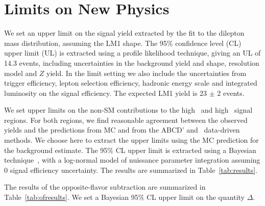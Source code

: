 \section{Limits on New Physics}
\label{sec:limit}

We set an upper limit on the signal yield extracted by the fit to the dilepton mass
distribution, assuming the LM1 shape. The 95\% confidence level (CL) upper limit (UL)
is extracted using a profile likelihood technique, giving an UL of 14.3 events, including
uncertainties in the background yield and shape, resolution model and $Z$ yield.
In the limit setting we also include the uncertainties from trigger efficiency,
lepton selection efficiency, hadronic energy scale and integrated luminosity on the signal efficiency.
The expected LM1 yield is 23 $\pm$ 2 events. 

We set upper limits on the non-SM contributions to the high \MET\ and high \Ht\ signal regions. 
For both regions, we find reasonable agreement between the observed yields and the predictions from MC and from the ABCD' and \ptll\
data-driven methods. We choose here to extract the upper limits using the MC prediction for the
background estimate. The 95\% CL upper limit is extracted using a Bayesian technique~\cite{ref:cl95cms}, 
with a log-normal model of nuissance parameter integration assuming 0 signal efficiency uncertainty. 
The results are summarized in Table~\ref{tab:results}. 

The results of the opposite-flavor subtraction are summarized in Table~\ref{tab:ofresults}.
We set a Bayesian 95\% CL upper limit on the quantity $\Delta$.


